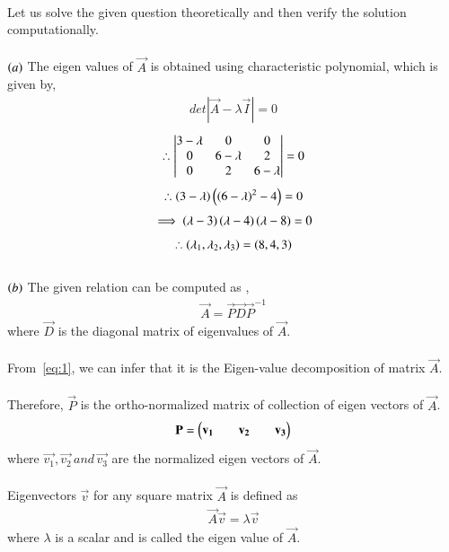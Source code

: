 \documentclass[journal]{IEEEtran}
\begin{document}
\solution \\
Let us solve the given question theoretically and then verify the solution computationally.\\
\\
$\left(a\right)$ The eigen values of $\vec{A}$ is obtained using characteristic polynomial, which is given by,
\begin{align}
    det|\vec{A}-\lambda\vec{I}|=0
\end{align}
\begin{align}
    \therefore \begin{vmatrix}3-\lambda&0&0\\0&6-\lambda&2\\0&2&6-\lambda\end{vmatrix}=0
\end{align}
\begin{align}
    \therefore \left(3-\lambda\right)\left(\left(6-\lambda\right)^2-4\right)=0
\end{align}
\begin{align}
    \implies  \left(\lambda-3\right)\left(\lambda-4\right)\left(\lambda-8\right)=0
\end{align}
\newpage
\vspace*{0.25cm}
\begin{align}
    \therefore \left(\lambda_1,\lambda_2,\lambda_3\right)=\left(8,4,3\right)
\end{align}
\\
$\left(b\right)$ The given relation can be computed as ,
\begin{align}
    \vec{A}=\vec{P}\vec{D}\vec{P}^{-1} \label{eq:1}
\end{align}
where $\vec{D}$ is the diagonal matrix of eigenvalues of $\vec{A}$.\\
\\
From~\eqref{eq:1}, we can infer that it is the Eigen-value decomposition of matrix $\vec{A}$.\\
\\
Therefore, $\vec{P}$ is the ortho-normalized matrix of collection of eigen vectors of $\vec{A}$.
\begin{align}
    \mathbf{P}=\begin{pmatrix}\mathbf{v_1}&&\mathbf{v_2}&&\mathbf{v_3}\end{pmatrix}
\end{align}
where $\vec{v_1},\vec{v_2} \,and\, \vec{v_3}$ are the normalized eigen vectors of $\vec{A}$.\\
\\
Eigenvectors $\vec{v}$ for any square matrix $\vec{A}$ is defined as 
\begin{align}
    \vec{A}\vec{v}=\lambda\vec{v}
\end{align}
where $\lambda$ is a scalar and is called the eigen value of $\vec{A}$.\\
\end{document}
